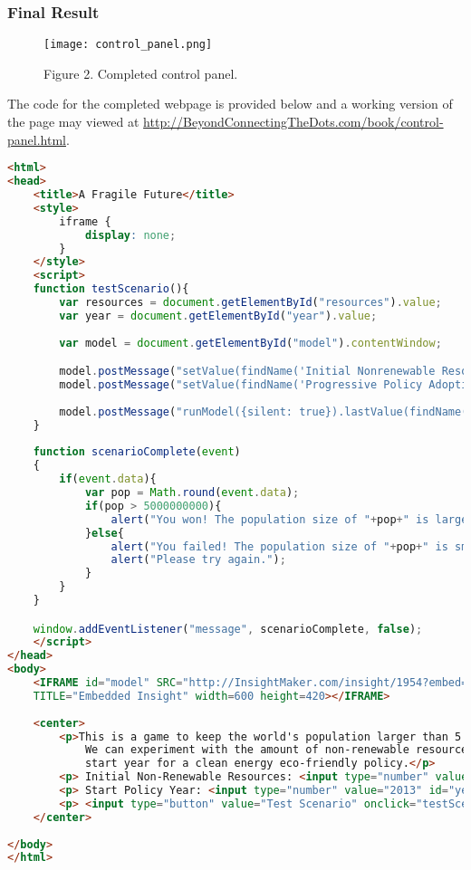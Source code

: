 \documentclass[]{memoir}
\let\Oldincludegraphics\includegraphics
\renewcommand{\includegraphics}[1]{\Oldincludegraphics[max size={\textwidth}{\textheight}]{#1}}
\begin{document}
\subsubsection{Final Result}

\begin{figure}[htbp]
\centering
\texttt{[image: control\_panel.png]}
\caption{Figure 2. Completed control panel.}
\end{figure}

The code for the completed webpage is provided below and a working
version of the page may viewed at
\url{http://BeyondConnectingTheDots.com/book/control-panel.html}.

\begin{lstlisting}[language=HTML]
<html>
<head>
    <title>A Fragile Future</title>
    <style>
        iframe {
            display: none;
        }
    </style>
    <script>
    function testScenario(){
        var resources = document.getElementById("resources").value;
        var year = document.getElementById("year").value;
        
        var model = document.getElementById("model").contentWindow;

        model.postMessage("setValue(findName('Initial Nonrenewable Resources'), '"+(resources/100)*1000000000000+"')", "*");
        model.postMessage("setValue(findName('Progressive Policy Adoption'), '"+year+"')", "*");
        
        model.postMessage("runModel({silent: true}).lastValue(findName('Population'))", "*");
    }
    
    function scenarioComplete(event)
    {
        if(event.data){
            var pop = Math.round(event.data);
            if(pop > 5000000000){
                alert("You won! The population size of "+pop+" is larger than 5 Billion!");
            }else{
                alert("You failed! The population size of "+pop+" is smaller than 5 Billion!");
                alert("Please try again.");
            }
        }
    }

    window.addEventListener("message", scenarioComplete, false);
    </script>
</head>
<body>
    <IFRAME id="model" SRC="http://InsightMaker.com/insight/1954?embed=1&topBar=1&sideBar=1&zoom=1"
    TITLE="Embedded Insight" width=600 height=420></IFRAME>  
    
    <center>
        <p>This is a game to keep the world's population larger than 5 billion in the year 2100.
            We can experiment with the amount of non-renewable resources in the world and the
            start year for a clean energy eco-friendly policy.</p>
        <p> Initial Non-Renewable Resources: <input type="number" value="100" id="resources" /> % </p>
        <p> Start Policy Year: <input type="number" value="2013" id="year" /> </p>
        <p> <input type="button" value="Test Scenario" onclick="testScenario()" /> </p>
    </center>
    
</body>
</html>
\end{lstlisting}
\end{document}
